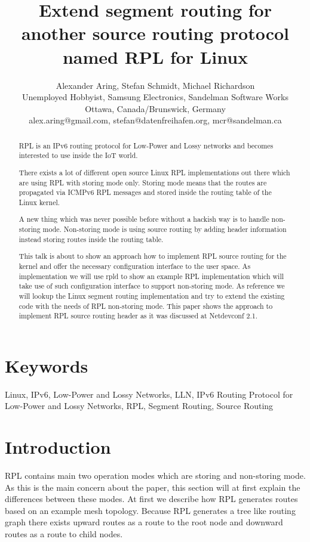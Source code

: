 \documentclass[letterpaper]{article}
\title{Extend segment routing for another source routing protocol named RPL for Linux}
\author{Alexander Aring, Stefan Schmidt, Michael Richardson\\
Unemployed Hobbyist, Samsung Electronics, Sandelman Software Works\\
Ottawa, Canada/Brunswick, Germany\\
alex.aring@gmail.com, stefan@datenfreihafen.org, mcr@sandelman.ca\\
\newline
\newline
}
\begin{document}
 
\maketitle
\begin{abstract}
RPL \cite{RFC6550} is an IPv6 routing protocol for Low-Power and Lossy networks and becomes interested to use inside the IoT world.

There exists a lot of different open source Linux RPL implementations out there which are using RPL with storing mode only.
Storing mode means that the routes are propagated via ICMPv6 RPL messages and stored inside the routing table of the Linux kernel.

A new thing which was never possible before without a hackish way is to handle non-storing mode.
Non-storing mode is using source routing by adding header information \cite{RFC6554} instead storing routes inside the routing table.

This talk is about to show an approach how to implement RPL source routing for the kernel and offer the necessary configuration interface to the user space.
As implementation we will use rpld \cite{rpld} to show an example RPL implementation which will take use of such configuration interface to support non-storing mode.
As reference we will lookup the Linux segment routing implementation and try to extend the existing code with the needs of RPL non-storing mode.
This paper shows the approach to implement RPL source routing header as it was discussed at Netdevconf 2.1.
\end{abstract}

\section{Keywords}

Linux, IPv6, Low-Power and Lossy Networks, LLN, IPv6 Routing Protocol for Low-Power and Lossy Networks, RPL, Segment Routing, Source Routing

\section{Introduction}

RPL contains main two operation modes which are storing and non-storing mode.
As this is the main concern about the paper, this section will at first explain the differences between these modes.
At first we describe how RPL generates routes based on an example mesh topology.
Because RPL generates a tree like routing graph there exists upward routes as a route to the root node and downward routes as a route to child nodes.
\end{document}
